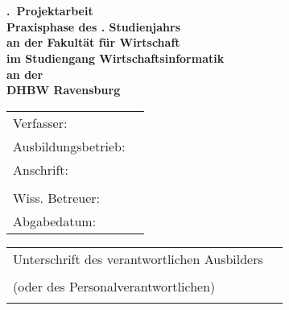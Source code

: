 \begin{titlepage}
	\begin{center}
		\vspace*{1cm}
		\LARGE\bf\myTopic\\
		\Large\rm\mySubTopic\\
		\vspace*{2cm}
		\bf \myProjNumber.~Projektarbeit\\
		\vspace*{1cm}
		\normalsize\rm
		Praxisphase des \myPraxPhase. Studienjahrs \\
		\vspace*{1cm}
		an der Fakultät für Wirtschaft\\
		im Studiengang Wirtschaftsinformatik\\
		\vspace*{1cm}
		an der\\
		DHBW Ravensburg
		\vfill
	\end{center}
	\begin{tabular}{ll}
		Verfasser:&\myAutor\\
		Ausbildungsbetrieb:&\myCompany\\
		Anschrift:&\myCompanyAddressStreet\\
		&\myCompanyAddressCity\\
		Wiss. Betreuer:&\myProf\\
		Abgabedatum:&\myEndDate\\
	\end{tabular}
	\newline
	\vspace*{1cm}
	\newline
	\begin{tabularx}{\textwidth}{l@{\extracolsep\fill}r}
	  Unterschrift des verantwortlichen Ausbilders&\\
	  (oder des Personalverantwortlichen)&\rule{6cm}{0.3mm}\\
	\end{tabularx}
\end{titlepage}
\newpage
\setcounter{page}{2}
